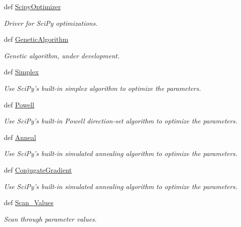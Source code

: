\begin{DoxyCompactItemize}
def \hyperlink{classforcebalance_1_1optimizer_1_1Optimizer_a503e87533bd9c257cb9c4b505af9c1de}{Scipy\-Optimizer}
\begin{DoxyCompactList}\small\item\em Driver for Sci\-Py optimizations. \end{DoxyCompactList}\item 
def \hyperlink{classforcebalance_1_1optimizer_1_1Optimizer_a50ffc779fbba5a99085cba45d868fc29}{Genetic\-Algorithm}
\begin{DoxyCompactList}\small\item\em Genetic algorithm, under development. \end{DoxyCompactList}\item 
def \hyperlink{classforcebalance_1_1optimizer_1_1Optimizer_a6b3af8115718f61a6a21c3297d717ead}{Simplex}
\begin{DoxyCompactList}\small\item\em Use Sci\-Py's built-\/in simplex algorithm to optimize the parameters. \end{DoxyCompactList}\item 
def \hyperlink{classforcebalance_1_1optimizer_1_1Optimizer_a0745b2e3607ef308ba48bb1d34e5be79}{Powell}
\begin{DoxyCompactList}\small\item\em Use Sci\-Py's built-\/in Powell direction-\/set algorithm to optimize the parameters. \end{DoxyCompactList}\item 
def \hyperlink{classforcebalance_1_1optimizer_1_1Optimizer_a183911848e43ca0be1893b87290dc31e}{Anneal}
\begin{DoxyCompactList}\small\item\em Use Sci\-Py's built-\/in simulated annealing algorithm to optimize the parameters. \end{DoxyCompactList}\item 
def \hyperlink{classforcebalance_1_1optimizer_1_1Optimizer_ad1e151204a172a4e75737b2b699d1623}{Conjugate\-Gradient}
\begin{DoxyCompactList}\small\item\em Use Sci\-Py's built-\/in simulated annealing algorithm to optimize the parameters. \end{DoxyCompactList}\item 
def \hyperlink{classforcebalance_1_1optimizer_1_1Optimizer_a6c7508252398ff7e00469c4c8acb0a48}{Scan\-\_\-\-Values}
\begin{DoxyCompactList}\small\item\em Scan through parameter values. \end{DoxyCompactList}\item 

\end{DoxyCompactItemize}

